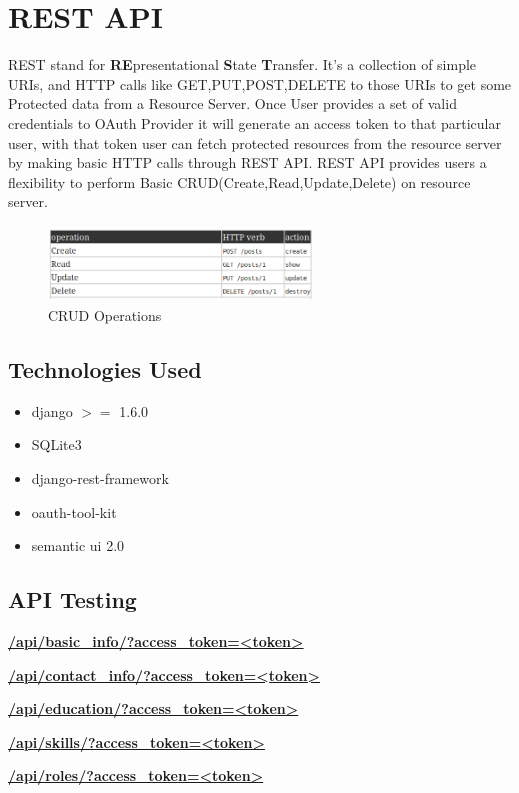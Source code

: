 \documentclass[12pt]{report}
\begin{document}
\section{REST API} 
\hspace{6mm}REST stand for \textbf{RE}presentational \textbf{S}tate \textbf{T}ransfer. It's a collection of simple URIs, and HTTP calls like GET,PUT,POST,DELETE to those URIs to get some Protected data from a Resource Server. Once User provides a set of valid credentials to OAuth Provider it will generate an access token to that particular user, with that token user can fetch protected resources from the resource server by making basic HTTP calls through REST API. REST API provides users a flexibility to perform Basic CRUD(Create,Read,Update,Delete) on resource server.
	\begin{figure}[H]
	\begin{center}
	\includegraphics[width=7cm,height=2cm]{CRUD}
	\caption{CRUD Operations\label{fig:CRUD Operations}}
	\end{center}
	\end{figure}
\subsection{Technologies Used}
\begin{itemize}
	\item django $ >= $ 1.6.0
	\item SQLite3
	\item django-rest-framework
	\item oauth-tool-kit
	\item semantic ui 2.0
\end{itemize}
\pagebreak
\subsection{API Testing}
\textbf{\url{/api/basic_info/?access_token=<token>}}
 
\underline{} \newline
\textbf{\url{/api/contact_info/?access_token=<token>}}

\underline{} \newline
\textbf{\url{/api/education/?access_token=<token>}}

\underline{} \newline
\textbf{\url{/api/skills/?access_token=<token>}}

\underline{} \newline
\textbf{\url{/api/roles/?access_token=<token>}}

\underline{} \newline
\end{document}
